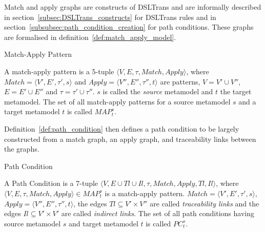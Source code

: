 Match and apply graphs are constructs of DSLTrans and are informally described in section~\ref{subsec:DSLTrans_constructs} for DSLTrans rules and in section~\ref{subsubsec:path_condition_creation} for path conditions. These graphs are formalised in definition~\ref{def:match_apply_model}.

\begin{definition}{Match-Apply Pattern}
\label{def:match_apply_model} 

A match-apply pattern is a 5-tuple $\langle V,E,\tau, Match,Apply\rangle$,
where $Match=\langle V',E',\tau',s\rangle$ and $Apply=\langle
V'',E'',\tau'',t\rangle$ are patterns, $V=V'\cup V''$, $E= E'\cup E''$ and
$\tau=\tau'\cup \tau''$. $s$ is called the \emph{source} metamodel and $t$ the
target metamodel. The set of all match-apply patterns for a source metamodel $s$
and a target metamodel $t$ is called $MAP^{s}_{t}$.

\end{definition}

Definition~\ref{def:path_condition} then defines a path condition to be largely constructed from a match graph, an apply graph, and traceability links between the graphs.

\begin{definition}{Path Condition}
\label{def:path_condition}

A Path Condition is a 7-tuple $\langle V,E\cup Tl\cup
Il,\tau,Match,Apply,Tl,Il\rangle$, where\\$\langle V,E,\tau,Match,Apply\rangle
\in MAP^{s}_{t}$ is a match-apply pattern. $Match=\langle V',E', \tau',s\rangle$,
$Apply=\langle V'',E'', \tau'',t\rangle$, the edges $Tl\subseteq V'\times V''$
are called \emph{traceability links} and the edges $Il\subseteq V'\times V'$ are
called \emph{indirect links}. The set of all path conditions having source
metamodel $s$ and target metamodel $t$ is called $PC^{s}_{t}$.

\end{definition}

